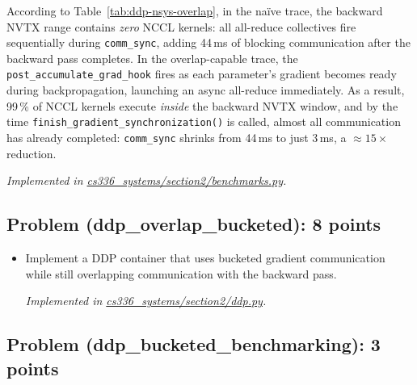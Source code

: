 \documentclass[letterpaper]{article}
\newcommand{\repofile}[2]{\href{https://github.com/echung32/ece405-assignment4-hpc/blob/main/#1}{#2}}
\begin{document}
\begin{itemize}
		According to Table~\ref{tab:ddp-nsys-overlap}, in the na\"ive trace, the backward NVTX range contains \emph{zero} NCCL kernels: all all-reduce collectives fire sequentially during \texttt{comm\_sync}, adding 44\,ms of blocking communication after the backward pass completes.
		In the overlap-capable trace, the \texttt{post\_accumulate\_grad\_hook} fires as each parameter's gradient becomes ready during backpropagation, launching an async all-reduce immediately.
		As a result, 99\,\% of NCCL kernels execute \emph{inside} the backward NVTX window, and by the time \texttt{finish\_gradient\_synchronization()} is called, almost all communication has already completed: \texttt{comm\_sync} shrinks from 44\,ms to just 3\,ms, a $\approx\!15\times$ reduction.
	\end{itemize}
	
	\textit{Implemented in \repofile{cs336_systems/section2/benchmarks.py}{cs336\_systems/section2/benchmarks.py}.}
	
	\subsection{Problem (ddp\_overlap\_bucketed): 8 points}
	
	\begin{itemize}
		\item[(a)] Implement a DDP container that uses bucketed gradient communication while still overlapping communication with the backward pass.
		
		\textit{Implemented in \repofile{cs336_systems/section2/ddp.py}{cs336\_systems/section2/ddp.py}.}
	\end{itemize}
	
	\subsection{Problem (ddp\_bucketed\_benchmarking): 3 points}
	
\end{document}
